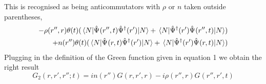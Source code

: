 \begin{solution}
\begin{equation}
\end{equation}
This is recognised as being anticommutators with $\rho$ or $n$ taken outside parentheses,
\begin{equation}
\begin{split}
    - \rho(r'',r) \theta(t)( \mel{N}{\hat{\Psi}_{}(r'',t)\hat{\Psi}_{}^{\dagger}(r') }{N} + \mel{N}{\hat{\Psi}_{}^{\dagger}(r')   \hat{\Psi}_{}(r'',t)   }{N}) \\
    + n(r'') \theta(t) ( \mel{N}{\hat{\Psi}_{}(r,t)\hat{\Psi}_{}^{\dagger}(r') }{N} +\mel{N}{\hat{\Psi}_{}^{\dagger}(r') \hat{\Psi}_{}(r,t)}{N})
    \end{split}
\end{equation}
Plugging in the definition of the Green function given in equation 1 we obtain the right result
\begin{equation}
    G_2(r,r',r'';t) = i n(r'') G(r,r',r) - i \rho(r'',r) G(r'',r',t)
\end{equation}
\end{solution}